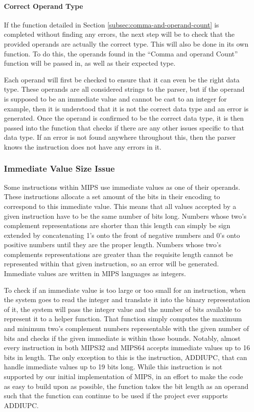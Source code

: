 \documentclass[
    parskip=half,
    fontsize=12pt,
    titlepage=firstiscover,
    toc=bibliography,
    numbers=endperiod
]{scrartcl}
\begin{document}
\paragraph{Correct Operand Type}

If the function detailed in Section \ref{subsec:comma-and-operand-count}
is completed without finding any errors, the next step will be to check
that the provided operands are actually the correct type. This will also
be done in its own function. To do this, the operands found in the
``Comma and operand Count'' function will be passed in, as well as their
expected type.

Each operand will first be checked to ensure that it can even be the
right data type. These operands are all considered strings to the
parser, but if the operand is supposed to be an immediate value and
cannot be cast to an integer for example, then it is understood that it
is not the correct data type and an error is generated. Once the operand
is confirmed to be the correct data type, it is then passed into the
function that checks if there are any other issues specific to that data
type. If an error is not found anywhere throughout this, then the parser
knows the instruction does not have any errors in it.

\subsubsection{Immediate Value Size Issue}

Some instructions within MIPS use immediate values as one of their
operands. These instructions allocate a set amount of the bits in their
encoding to correspond to this immediate value. This means that all
values accepted by a given instruction have to be the same number of
bits long. Numbers whose two's complement representations are shorter
than this length can simply be sign extended by concatenating 1's onto
the front of negative numbers and 0's onto positive numbers until they
are the proper length. Numbers whose two's complements representations
are greater than the requisite length cannot be represented within that
given instruction, so an error will be generated. Immediate values are
written in MIPS languages as integers.

To check if an immediate value is too large or too small for an
instruction, when the system goes to read the integer and translate it
into the binary representation of it, the system will pass the integer
value and the number of bits available to represent it to a helper
function. That function simply computes the maximum and minimum two's
complement numbers representable with the given number of bits and
checks if the given immediate is within those bounds. Notably, almost
every instruction in both MIPS32 and MIPS64 accepts immediate values up
to 16 bits in length. The only exception to this is the instruction,
ADDIUPC, that can handle immediate values up to 19 bits long. While this
instruction is not supported by our initial implementation of MIPS, in
an effort to make the code as easy to build upon as possible, the
function takes the bit length as an operand such that the function can
continue to be used if the project ever supports ADDIUPC.
\end{document}
